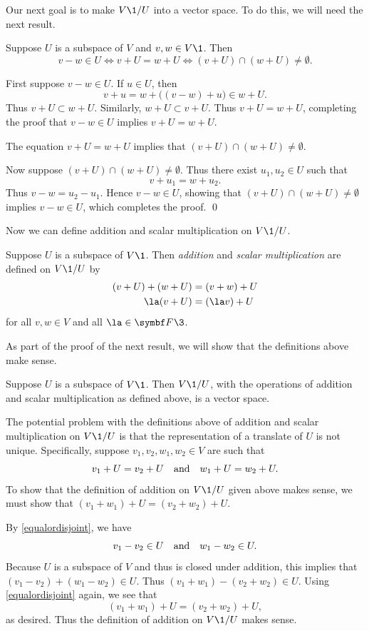 Our next goal is to make $V\1/U$ into a vector space. To do this, we will need the next result.

{Suppose $U$ is a subspace of $V$ and $v, w \in V\1$. Then
\[
v - w \in U
\iff
v+U =w+U
\iff
(v+U) \cap (w+U) \ne \emptyset.
\]
}

\proof
First suppose $v - w \in U$.  If $u \in U$, then
\[
v + u = w + \bigl((v - w) + u\bigr) \in w + U.
\]
Thus $v + U \subset w + U$. Similarly, $w + U \subset v + U$. Thus $v+U =w+U$, completing the proof that $v - w \in U$ implies
$v+U =w+U$.

The equation $v+U =w+U$ implies that $(v+U) \cap (w+U) \ne \emptyset$.

Now suppose $(v+U) \cap (w+U) \ne \emptyset$. Thus there exist $u_1, u_2 \in U$ such that
\[
v + u_1 = w + u_2.
\]
Thus $v-w = u_2 - u_1$. Hence $v - w \in U$, showing that $(v+U) \cap (w+U) \ne \emptyset$ implies $v - w \in U$, which completes the proof.
\qed

Now we can define addition and scalar multiplication on $V\1/U$.

{Suppose $U$ is a subspace of $V\1$. Then \emph{addition} and \emph{scalar multiplication} are defined on $V\1/U$ by
\begin{align*}
(v + U) + (w + U) &= (v+w) + U\\
\la(v + U) &= (\la v) + U
\end{align*}
for all $v, w \in V$ and all $\la \in \F{}\3$.
}

As part of the proof of the next result, we will show that the definitions above make sense.

{Suppose $U$ is a subspace of $V\1$. Then $V\1/U$, with the operations of addition and scalar multiplication as defined above, is a vector space.}

\proof
The potential problem with the definitions above of addition and scalar multiplication on $V\1/U$ is that the representation of a translate of $U$ is not unique. Specifically, suppose $v_1, v_2, w_1, w_2\in V$ are such that
\[
v_1 + U = v_2 + U \quad \text{and} \quad w_1 + U = w_2 + U.
\]
To show that the definition of addition on $V\1/U$ given above makes sense, we must show that $(v_1+w_1) + U = (v_2 + w_2) + U$.

By \ref{equalordisjoint}, we have
\[
v_1 - v_2 \in U \quad \text{and} \quad w_1 - w_2 \in U.
\]
Because $U$ is a subspace of $V$ and thus is closed under addition, this implies that
$(v_1 - v_2) + (w_1 - w_2) \in U$. Thus $(v_1 + w_1) - (v_2 + w_2) \in U$. Using \ref{equalordisjoint} again, we see that
\[
(v_1+w_1) + U = (v_2+w_2) + U,
\]
as desired. Thus the definition of addition on $V\1/U$ makes sense.

